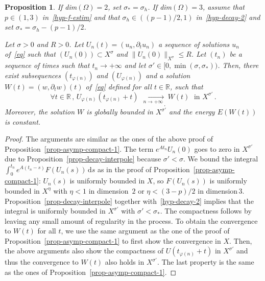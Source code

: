 \documentclass[11pt]{article}
\newtheorem{prop}[theo]{Proposition}
\theoremstyle{definition}
\numberwithin{equation}{section}
\numberwithin{figure}{section}
\numberwithin{table}{section}
\newcommand{\RR}{\mathbb{R}}
\newcommand{\drm}{\mathrm{d}}
\let\oldforall\forall
\renewcommand*{\forall}{\mathrel{\oldforall}}
\begin{document}
\goodbreak

\begin{prop}\label{prop-asymp-compact-2}
If dim$(\Omega)=2$, set $\sigma_*=\sigma_h$. If dim$(\Omega)=3$, assume that $p\in(1,3)$ in~\eqref{hyp-f-estim} and that $\sigma_h\in ((p-1)/2,1)$ in~\eqref{hyp-decay-2} and set $\sigma_*=\sigma_h - (p-1)/2$.

Let $\sigma>0$ and $R>0$. Let $U_n(t)=(u_n,\partial_t u_n)$ a sequence of solutions $u_n$ of~\eqref{eq} such that $(U_n(0))\subset X^\sigma$ and $\|U_n(0)\|_{X^\sigma}\leq R$. Let $(t_n)$ be a sequence of times such that $t_n\rightarrow +\infty$ and let $\sigma'\in [0,\min(\sigma,\sigma_*))$. Then, there exist subsequences $(t_{\varphi(n)})$ and $(U_{\varphi(n)})$ and a solution $W(t)=(w,\partial_t w)(t)$ of~\eqref{eq} defined for all $t\in\RR$, such that
\[
\forall
t\in\RR\,,\,U_{\varphi(n)}(t_{\varphi(n)}+t)\,\xrightarrow[\;n\longrightarrow
+\infty\:]{}_,W(t)\;\text{ in } X^{\sigma'}\,.
\]
Moreover, the solution $W$ is globally bounded in $X^{\sigma'}$ and the energy $E(W(t))$ is constant.
\end{prop}
\begin{proof}
The arguments are similar as the ones of the above proof of Proposition~\ref{prop-asymp-compact-1}. The term $e^{At_n}U_n(0)$ goes to zero in $X^{\sigma'}$ due to Proposition~\ref{prop-decay-interpole} because $\sigma'<\sigma$. We bound the integral $\int_0^{t_n} e^{A(t_n-s)}F(U_n(s))\,\drm s$ as in the proof of Proposition~\ref{prop-asymp-compact-1}: $U_n(s)$ is uniformly bounded in $X$, so $F(U_n(s))$ is uniformly bounded in $X^\eta$ with $\eta<1$ in dimension~$2$ or $\eta<(3-p)/2$ in dimension\,$3$. Proposition~\ref{prop-decay-interpole} together with~\eqref{hyp-decay-2} implies that the integral is uniformly bounded in $X^{\sigma'}$ with $\sigma'<\sigma_*$. The compactness follows by leaving any small amount of regularity in the process. To obtain the convergence to $W(t)$ for all $t$, we use the same argument as the one of the proof of Proposition~\ref{prop-asymp-compact-1} to first show the convergence in $X$. Then, the above arguments also show the compactness of $U(t_{\varphi(n)}+t)$ in $X^{\sigma'}$ and thus the convergence to $W(t)$ also holds in $X^{\sigma'}$. The last property is the same as the ones of Proposition~\ref{prop-asymp-compact-1}.
\end{proof}
\end{document}
